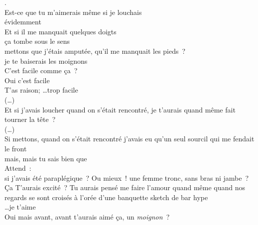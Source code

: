 \begin{drama}
    \Jspeaks.\\
Est-ce que tu m’aimerais même si je louchais\\[2ex]
évidemment\\[2ex]
Et si il me manquait quelques doigts\\[2ex]
ça tombe sous le sens\\[2ex]
mettons que j’étais amputée, qu’il me manquait les pieds ?\\[2ex]
je te baiserais les moignons\\[2ex]
C’est facile comme ça ?\\[2ex]
Oui c’est facile\\[2ex]
T’as raison; \ldots trop facile\\[2ex]
(…)\\[2ex]
Et si j’avais loucher quand on s’était rencontré, je t’aurais quand même fait tourner la tête ?\\[2ex]
(…)\\[2ex]
Si mettons, quand on s’était rencontré j'avais eu qu’un seul sourcil qui me
fendait le front\\[2ex]
mais, mais tu sais bien que\\[2ex]
Attend :\\
	si j’avais été paraplégique ? Ou mieux ! une femme tronc, sans bras ni
jambe ? Ça T’aurais excité ? Tu aurais pensé me faire l’amour quand même quand
nos regards se sont croisés à l’orée d’une banquette sketch de bar hype\\[2ex]

	\ldots je t’aime\\[2ex]
	Oui mais avant, avant t’aurais aimé ça, un \textit{moignon} ? \\[2ex]
\clearpage
{}


\end{drama}
